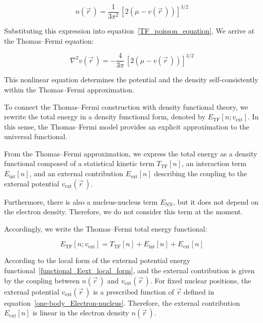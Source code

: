 \begin{equation}
    n(\vec{r}\,) = \frac{1}{3\pi^2}\,[2(\mu - v(\vec{r}\,))]^{3/2}
\label{TF_density_muV}
\end{equation}

Substituting this expression into equation~\eqref{TF_poisson_equation},
We arrive at the Thomas--Fermi equation:

\begin{equation}
    \nabla^2 v(\vec{r}\,)=-\frac{4}{3\pi}\,[2(\mu-v(\vec{r}\,))]^{3/2}
\label{thomas_fermi_equation}
\end{equation}

This nonlinear equation determines the potential and the density self-consistently within the Thomas--Fermi approximation.

To connect the Thomas--Fermi construction with density functional theory, we rewrite the total energy in a density functional form, denoted by $E_{\mathrm{TF}}[n;v_\mathrm{ext}]$. In this sense, the Thomas--Fermi model provides an explicit approximation to the universal functional.

From the Thomas--Fermi approximation, we express the total energy as a density functional composed of a statistical kinetic term $T_\mathrm{TF}[n]$, an interaction term $E_\mathrm{int}[n]$, and an external contribution $E_\mathrm{ext}[n]$ describing the coupling to the external potential $v_\mathrm{ext}(\vec{r}\,)$.

Furthermore, there is also a nucleus-nucleus term $E_\mathrm{NN}$, but it does not depend on the electron density. Therefore, we do not consider this term at the moment.

Accordingly, we write the Thomas--Fermi total energy functional:

\begin{equation}
    E_{\mathrm{TF}}[n;v_\mathrm{ext}] = T_\mathrm{TF}[n] + E_\mathrm{int}[n] + E_\mathrm{ext}[n]
\label{TF_total_energy_functional}
\end{equation}

According to the local form of the external potential energy functional~\eqref{functional_Eext_local_form}, and the external contribution is given by the coupling between $n(\vec{r}\,)$ and $v_\mathrm{ext}(\vec{r}\,)$.
For fixed nuclear positions, the external potential $v_\mathrm{ext}(\vec{r}\,)$ is a prescribed function of $\vec{r}$ defined in equation~\eqref{one-body_Electron-nucleus}. Therefore, the external contribution $E_\mathrm{ext}[n]$ is linear in the electron density $n(\vec{r}\,)$.


